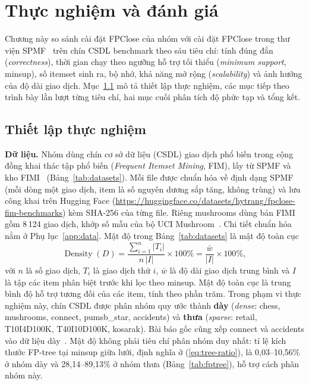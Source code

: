 
\section{\texorpdfstring{Thực nghiệm và đánh giá}{CHƯƠNG 2: THỰC NGHIỆM VÀ ĐÁNH GIÁ}}
\label{sec:experiments}

Chương này so sánh cài đặt FPClose của nhóm với cài đặt FPClose trong thư viện SPMF~\cite{spmf} trên chín CSDL
benchmark theo sáu tiêu chí: tính đúng đắn (\textit{correctness}), thời gian chạy theo ngưỡng hỗ trợ tối thiểu
(\textit{minimum support}, minsup), số itemset sinh ra, bộ nhớ, khả năng mở rộng (\textit{scalability}) và ảnh hưởng
của độ dài giao dịch. Mục~\ref{sec:setup} mô tả thiết lập thực nghiệm, các mục tiếp theo trình bày lần lượt từng tiêu
chí, hai mục cuối phân tích độ phức tạp và tổng kết.

\subsection{Thiết lập thực nghiệm}
\label{sec:setup}

\textbf{Dữ liệu.} Nhóm dùng chín cơ sở dữ liệu (CSDL) giao dịch phổ biến trong cộng đồng khai thác tập phổ biến
(\textit{Frequent Itemset Mining}, FIM), lấy từ SPMF và kho FIMI~\cite{fimi03} (Bảng~\ref{tab:datasets}). Mỗi file
được chuẩn hóa về định dạng SPMF (mỗi dòng một giao dịch, item là số nguyên dương sắp tăng, không trùng) và lưu công
khai trên Hugging Face (\url{https://huggingface.co/datasets/hytrang/fpclose-fim-benchmarks}) kèm SHA-256 của từng
file. Riêng mushrooms dùng bản FIMI gồm 8\,124 giao dịch, khớp số mẫu của bộ UCI Mushroom~\cite{uci_mushroom}. Chi
tiết chuẩn hóa nằm ở Phụ lục~\ref{app:data}. Mật độ trong Bảng~\ref{tab:datasets} là mật độ toàn cục
\begin{equation}
\operatorname{Density}(D)=\frac{\sum_{i=1}^{n}|T_i|}{n\,|I|}\times 100\%=\frac{\bar{w}}{|I|}\times 100\%,
\label{eq:density}
\end{equation}
với $n$ là số giao dịch, $T_i$ là giao dịch thứ $i$, $\bar{w}$ là độ dài giao dịch trung bình và $I$ là tập các item
phân biệt trước khi lọc theo minsup. Mật độ toàn cục là trung bình độ hỗ trợ tương đối của các item, tính theo phần
trăm. Trong phạm vi thực nghiệm này, chín CSDL được phân nhóm quy ước thành \textbf{dày} (\textit{dense}: chess,
mushrooms, connect, pumsb\_star, accidents) và \textbf{thưa} (\textit{sparse}: retail, T10I4D100K, T40I10D100K,
kosarak). Bài báo gốc cũng xếp connect và accidents vào dữ liệu dày~\cite{grahne2005}. Mật độ không phải tiêu chí
phân nhóm duy nhất: tỉ lệ kích thước FP-tree tại minsup giữa lưới, định nghĩa ở (\ref{eq:tree-ratio}), là
0{,}03--10{,}56\% ở nhóm dày và 28{,}14--89{,}13\% ở nhóm thưa (Bảng~\ref{tab:fptree}), hỗ trợ cách phân nhóm này.

